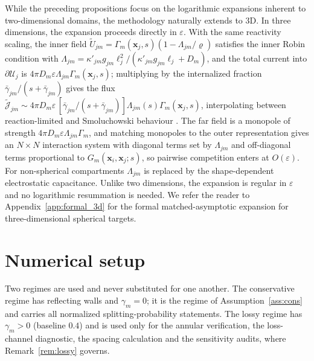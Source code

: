 \documentclass[pdflatex,sn-mathphys-num]{sn-jnl}
\numberwithin{equation}{section}
\theoremstyle{thmstyleone}%
\theoremstyle{definition}
\theoremstyle{remark}
\begin{document}
While the preceding propositions focus on the logarithmic expansions inherent to two-dimensional domains, the methodology naturally extends to 3D. In three dimensions, the expansion proceeds directly in $\varepsilon$. With the same reactivity scaling, the inner field $\widetilde U_{jm}=\Gamma_m(\mathbf x_j,s)(1-\Lambda_{jm}/\varrho)$ satisfies the inner Robin condition with $\Lambda_{jm}=\kappa'_{jm}g_{jm}\ell_j^2/(\kappa'_{jm}g_{jm}\ell_j+D_m)$, and the total current into $\partial\mathcal U_j$ is $4\pi D_m\varepsilon\Lambda_{jm}\Gamma_m(\mathbf x_j,s)$; multiplying by the
internalized fraction $\bar\gamma_{jm}/(s+\bar\gamma_{jm})$ gives the flux $\widetilde{\mathcal J}_{jm}\sim4\pi D_m\varepsilon\, [\bar\gamma_{jm}/(s+\bar\gamma_{jm})]\Lambda_{jm}(s)\Gamma_m(\mathbf x_j,s)$, interpolating between reaction-limited and Smoluchowski behaviour \cite{smoluchowski1917versuch,collins1949diffusion,grebenkov2020diffusion,gao2022rolling}.
The far field is a monopole of strength $4\pi D_m\varepsilon\Lambda_{jm}\Gamma_m$, and matching monopoles to the outer representation gives an $N\times N$ interaction system with diagonal terms set by $\Lambda_{jm}$ and off-diagonal terms proportional to $G_m(\mathbf x_i,\mathbf x_j;s)$, so pairwise competition enters at $O(\varepsilon)$. For non-spherical compartments $\Lambda_{jm}$ is replaced by
the shape-dependent electrostatic capacitance. Unlike two dimensions, the expansion is regular in $\varepsilon$ and no logarithmic resummation is needed. We refer the reader to Appendix~\ref{app:formal_3d} for the formal matched-asymptotic expansion for three-dimensional spherical targets.

\section{Numerical setup}
\label{sec:numerics}
Two regimes are used and never substituted for one another. The conservative regime has reflecting walls and $\gamma_m=0$; it is the regime of Assumption~\ref{ass:cons} and carries all normalized splitting-probability statements. The lossy regime has $\gamma_m>0$ (baseline $0.4$) and is used only for the annular verification, the loss-channel diagnostic, the spacing calculation and the sensitivity audits, where Remark~\ref{rem:lossy} governs.
\end{document}
